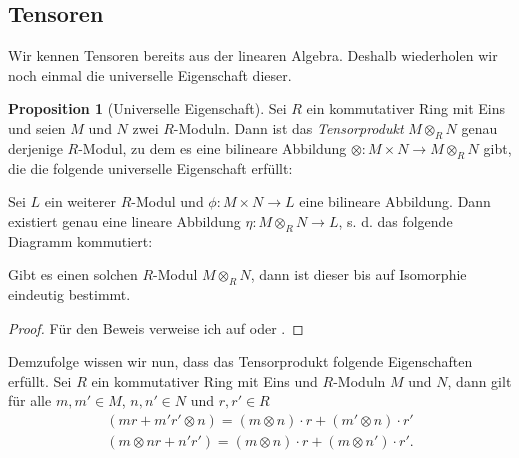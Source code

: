 \documentclass[11pt,titlepage]{article}
\theoremstyle{definition}
\newtheorem{proposition}[theorem]{Proposition}
\theoremstyle{remark}
\begin{document}
	\subsection{Tensoren}
	
	Wir kennen Tensoren bereits aus der linearen Algebra. Deshalb wiederholen wir noch einmal die universelle 
	Eigenschaft dieser.
	
	\begin{proposition}[Universelle Eigenschaft] \label{prop:univeig}
		Sei $R$ ein kommutativer Ring mit Eins und seien $M$ und $N$ zwei $R$-Moduln. Dann ist das 
		\textsl{Tensorprodukt} $M\otimes_R N$ genau derjenige $R$-Modul, zu dem es eine bilineare Abbildung 
		$\otimes: M\times N \to M\otimes_R N$ gibt, die die folgende universelle Eigenschaft erfüllt:
		\begin{center}
			Sei $L$ ein weiterer $R$-Modul und $\phi: M\times N \to L$ eine bilineare Abbildung. Dann 
			existiert genau eine lineare Abbildung $\eta: M\otimes_R N \to L$, s. d. das folgende Diagramm 
			kommutiert:
			\begin{center}
			\end{center}
		\end{center}
		Gibt es einen solchen $R$-Modul $M\otimes_R N$, dann ist dieser bis auf Isomorphie eindeutig bestimmt.
	\end{proposition}
	
	\begin{proof}
		Für den Beweis verweise ich auf \cite[Proposition 2.12]{introductiontocomalg} oder \cite[Satz 7.3]{SkriptLA}.
	\end{proof}
	
	Demzufolge wissen wir nun, dass das Tensorprodukt folgende Eigenschaften erfüllt. Sei $R$ ein kommutativer Ring 
	mit Eins und $R$-Moduln $M$ und $N$, dann gilt für alle $m,m'\in M$, $n,n'\in N$ und $r,r'\in R$
	\begin{align*}
		(mr+m'r'\otimes n)=(m\otimes n)\cdot r +(m'\otimes n)\cdot r' \\
		(m\otimes nr+n'r')=(m\otimes n)\cdot r+(m\otimes n')\cdot r'.
	\end{align*}
	
\end{document}
